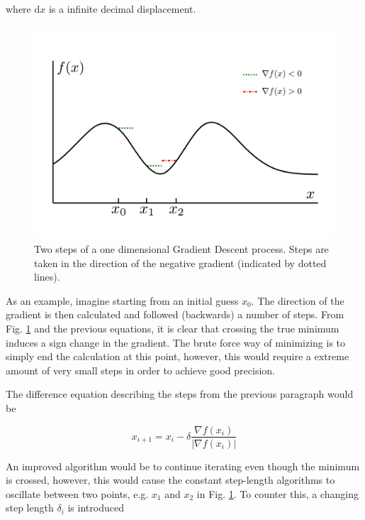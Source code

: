 where $\mathrm{d}x$ is a infinite decimal displacement. 

\begin{figure}
 \begin{center}
  \includegraphics[scale=0.3]{../Graphics/SGD.pdf}
  \caption{Two steps of a one dimensional Gradient Descent process. Steps are taken in the direction of the negative gradient (indicated by dotted lines).}
  \label{fig:SGD}
 \end{center}
\end{figure}

As an example, imagine starting from an initial guess $x_0$. The direction of the gradient is then calculated and followed (backwards) a number of steps. From Fig. \ref{fig:SGD} and the previous equations, it is clear that crossing the true minimum induces a sign change in the gradient. The brute force way of minimizing is to simply end the calculation at this point, however, this would require a extreme amount of very small steps in order to achieve good precision. 

The difference equation describing the steps from the previous paragraph would be

\begin{equation}
 x_{i+1} = x_i - \delta\frac{\nabla f(x_i)}{|\nabla f(x_i)|}
\end{equation}


An improved algorithm would be to continue iterating even though the minimum is crossed, however, this would cause the constant step-length algorithms to oscillate between two points, e.g. $x_1$ and $x_2$ in Fig. \ref{fig:SGD}. To counter this, a changing step length $\delta_i$ is introduced


